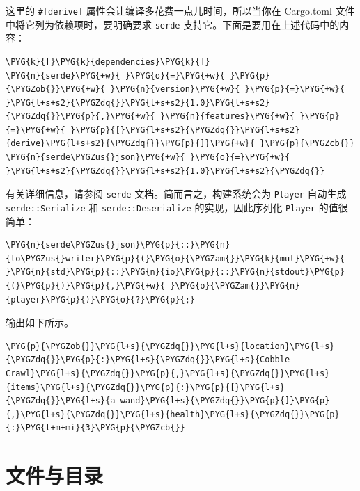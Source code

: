 这里的 \texttt{\#[derive]} 属性会让编译多花费一点儿时间，所以当你在 Cargo.toml 文件中将它列为依赖项时，要明确要求 \texttt{serde} 支持它。下面是要用在上述代码中的内容：

\begin{Verbatim}[commandchars=\\\{\},breaklines=true,breakanywhere=true,fontsize=\codefont,xleftmargin=17bp]
\PYG{k}{[}\PYG{k}{dependencies}\PYG{k}{]}
\PYG{n}{serde}\PYG{+w}{ }\PYG{o}{=}\PYG{+w}{ }\PYG{p}{\PYGZob{}}\PYG{+w}{ }\PYG{n}{version}\PYG{+w}{ }\PYG{p}{=}\PYG{+w}{ }\PYG{l+s+s2}{\PYGZdq{}}\PYG{l+s+s2}{1.0}\PYG{l+s+s2}{\PYGZdq{}}\PYG{p}{,}\PYG{+w}{ }\PYG{n}{features}\PYG{+w}{ }\PYG{p}{=}\PYG{+w}{ }\PYG{p}{[}\PYG{l+s+s2}{\PYGZdq{}}\PYG{l+s+s2}{derive}\PYG{l+s+s2}{\PYGZdq{}}\PYG{p}{]}\PYG{+w}{ }\PYG{p}{\PYGZcb{}}
\PYG{n}{serde\PYGZus{}json}\PYG{+w}{ }\PYG{o}{=}\PYG{+w}{ }\PYG{l+s+s2}{\PYGZdq{}}\PYG{l+s+s2}{1.0}\PYG{l+s+s2}{\PYGZdq{}}
\end{Verbatim}

有关详细信息，请参阅 \texttt{serde} 文档。简而言之，构建系统会为 \texttt{Player} 自动生成 \texttt{serde::Serialize} 和 \texttt{serde::Deserialize} 的实现，因此序列化 \texttt{Player} 的值很简单：

\begin{Verbatim}[commandchars=\\\{\},breaklines=true,breakanywhere=true,fontsize=\codefont,xleftmargin=17bp]
\PYG{n}{serde\PYGZus{}json}\PYG{p}{::}\PYG{n}{to\PYGZus{}writer}\PYG{p}{(}\PYG{o}{\PYGZam{}}\PYG{k}{mut}\PYG{+w}{ }\PYG{n}{std}\PYG{p}{::}\PYG{n}{io}\PYG{p}{::}\PYG{n}{stdout}\PYG{p}{(}\PYG{p}{)}\PYG{p}{,}\PYG{+w}{ }\PYG{o}{\PYGZam{}}\PYG{n}{player}\PYG{p}{)}\PYG{o}{?}\PYG{p}{;}
\end{Verbatim}

输出如下所示。

\begin{Verbatim}[commandchars=\\\{\},breaklines=true,breakanywhere=true,fontsize=\codefont,xleftmargin=17bp]
\PYG{p}{\PYGZob{}}\PYG{l+s}{\PYGZdq{}}\PYG{l+s}{location}\PYG{l+s}{\PYGZdq{}}\PYG{p}{:}\PYG{l+s}{\PYGZdq{}}\PYG{l+s}{Cobble Crawl}\PYG{l+s}{\PYGZdq{}}\PYG{p}{,}\PYG{l+s}{\PYGZdq{}}\PYG{l+s}{items}\PYG{l+s}{\PYGZdq{}}\PYG{p}{:}\PYG{p}{[}\PYG{l+s}{\PYGZdq{}}\PYG{l+s}{a wand}\PYG{l+s}{\PYGZdq{}}\PYG{p}{]}\PYG{p}{,}\PYG{l+s}{\PYGZdq{}}\PYG{l+s}{health}\PYG{l+s}{\PYGZdq{}}\PYG{p}{:}\PYG{l+m+mi}{3}\PYG{p}{\PYGZcb{}}
\end{Verbatim}

\section{文件与目录}

